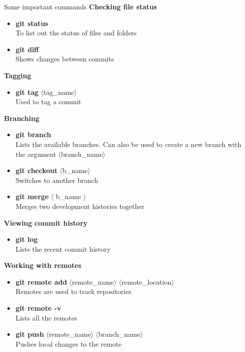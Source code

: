 \documentclass{beamer}
\begin{document}
\begin{frame}[allowframebreaks]{Some important commands}
	\textbf{Checking file status }
	\begin{itemize}
	\item {\textbf{git status} \\ To list out the status of files and folders}
	\item {\textbf{git diff} \\ Shows changes between commits}	
	\end{itemize}

	\textbf{Tagging }
	\begin{itemize}
	\item {\textbf{git tag} $\langle$tag\_name$\rangle$ \\ Used to tag a commit}
	\end{itemize}
	
	\textbf{Branching}
	\begin{itemize}
	\item {\textbf{git branch} \\ Lists the available branches. Can also be used to create a new branch with the argument $\langle$branch\_name$\rangle$}
	\item {\textbf{git checkout} $\langle$b\_name$\rangle$ \\ Switches to another branch}	
	\item {\textbf{git merge }$\langle$ b\_name $\rangle$ \\ Merges two development histories together}
	\end{itemize}

	\textbf{Viewing commit history }
	\begin{itemize}
		\item {\textbf{git log} \\ Lists the recent commit history}	
	\end{itemize}
	
	\framebreak
	\textbf{Working with remotes}
	\begin{itemize}
		\item {\textbf{git remote add} $\langle$remote\_name$\rangle$ $\langle$remote\_location$\rangle$ \\ Remotes are used to track repositories}
		\item {\textbf{git remote -v} \\ Lists all the remotes}
		\item {\textbf{git push} $\langle$remote\_name$\rangle$ $\langle$branch\_name$\rangle$\\Pushes local changes to the remote }
	\end{itemize}
	
\end{frame}	
\end{document}
